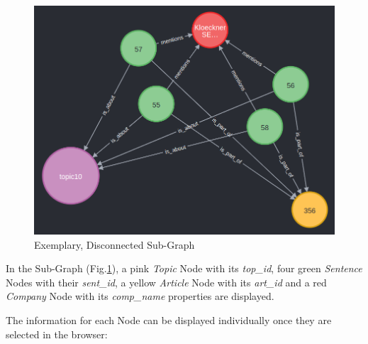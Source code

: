 \begin{figure}[H]   %
    \centering
    \includegraphics[width=1.0\textwidth]{Assets/kg-data-2}
    \caption{Exemplary, Disconnected Sub-Graph}
    \label{fig:kg-data-2}
\end{figure}

In the Sub-Graph (Fig.\ref{fig:kg-data-2}), a pink \emph{Topic} Node with its \emph{top\_id},
four green \emph{Sentence} Nodes with their \emph{sent\_id},
a yellow \emph{Article} Node with its \emph{art\_id} and
a red \emph{Company} Node with its \emph{comp\_name} properties are displayed.

The information for each Node can be displayed individually once they are selected in the browser:

